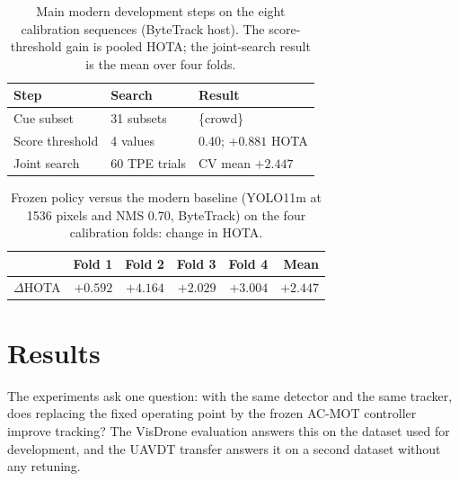 \documentclass[pdflatex,sn-mathphys-num,iicol]{sn-jnl}
\begin{document}
\begin{table}[t]
\caption{Main modern development steps on the eight calibration sequences
(ByteTrack host). The score-threshold gain is pooled HOTA; the joint-search
result is the mean over four folds.}
\label{tab:devrecord}
\centering\footnotesize
\setlength{\tabcolsep}{3pt}
\begin{tabular}{@{}lll@{}}
\toprule
Step & Search & Result\\
\midrule
Cue subset & 31 subsets & \{crowd\}\\
Score threshold & 4 values & 0.40; $+0.881$ HOTA\\
Joint search & 60 TPE trials & CV mean $+2.447$\\
\bottomrule
\end{tabular}
\end{table}

\begin{table}[t]
\caption{Frozen policy versus the modern baseline (YOLO11m at 1536 pixels and
NMS 0.70, ByteTrack) on the four calibration folds: change in HOTA.}
\label{tab:folds}
\centering\footnotesize
\begin{tabular}{@{}lrrrrr@{}}
\toprule
 & Fold 1 & Fold 2 & Fold 3 & Fold 4 & Mean\\
\midrule
$\Delta$HOTA & $+0.592$ & $+4.164$ & $+2.029$ & $+3.004$ & $+2.447$\\
\bottomrule
\end{tabular}
\end{table}
\section{Results}\label{sec:results}

The experiments ask one question: with the same detector and the same
tracker, does replacing the fixed operating point by the frozen AC-MOT
controller improve tracking? The VisDrone evaluation answers this on the
dataset used for development, and the UAVDT transfer answers it on a second
dataset without any retuning.
\end{document}
